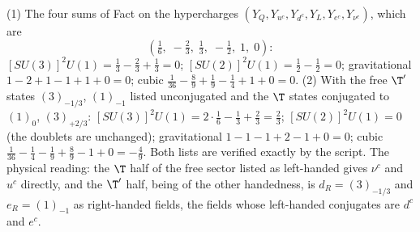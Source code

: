 (1) The four sums of Fact  on the hypercharges $(Y_{Q}, Y_{u^{c}}, Y_{d^{c}}, Y_{L}, Y_{e^{c}}, Y_{\nu^{c}})$, which are
\[
(\tfrac16,\; -\tfrac23,\; \tfrac13,\; -\tfrac12,\; 1,\; 0):
\] $[SU(3)]^{2}U(1) = \tfrac13 - \tfrac23 + \tfrac13 = 0$; $[SU(2)]^{2}U(1) = \tfrac12 - \tfrac12 = 0$; gravitational $1 - 2 + 1 - 1 + 1 + 0 = 0$; cubic $\tfrac{1}{36} - \tfrac89 + \tfrac19 - \tfrac14 + 1 + 0 = 0$. (2) With the free $\T'$ states $(3)_{-1/3}$, $(1)_{-1}$ listed unconjugated and the $\T$ states conjugated to $(1)_{0}$, $(3)_{+2/3}$: $[SU(3)]^{2}U(1) = 2 \cdot \tfrac16 - \tfrac13 + \tfrac23 = \tfrac23$; $[SU(2)]^{2}U(1) = 0$ (the doublets are unchanged); gravitational $1 - 1 - 1 + 2 - 1 + 0 = 0$; cubic $\tfrac{1}{36} - \tfrac14 - \tfrac19 + \tfrac89 - 1 + 0 = -\tfrac49$. Both lists are verified exactly by the script. The physical reading: the $\T$ half of the free sector listed as left-handed gives $\nu^{c}$ and $u^{c}$ directly, and the $\T'$ half, being of the other handedness, is $d_{R} = (3)_{-1/3}$ and $e_{R} = (1)_{-1}$ as right-handed fields, the fields whose left-handed conjugates are $d^{c}$ and $e^{c}$.

